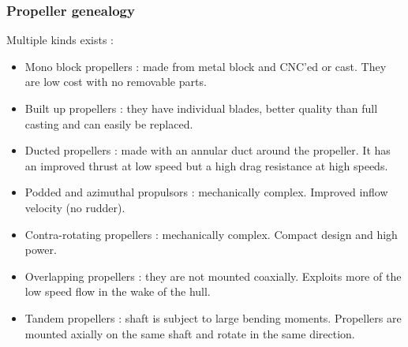 \documentclass[../main.tex]{subfiles}
\begin{document}
\subsubsection{Propeller genealogy}
Multiple kinds exists : \begin{itemize}
    \item Mono block propellers : made from metal block and CNC'ed or cast. They are low cost with no removable parts.
    \item Built up propellers : they have individual blades, better quality than full casting and can easily be replaced.
    \item Ducted propellers : made with an annular duct around the propeller. It has an improved thrust at low speed but a high drag resistance at high speeds.
    \item Podded and azimuthal propulsors : mechanically complex. Improved inflow velocity (no rudder). 
    \item Contra-rotating propellers : mechanically complex. Compact design and high power. 
    \item Overlapping propellers : they are not mounted coaxially. Exploits more of the low speed flow in the wake of the hull.
    \item Tandem propellers : shaft is subject to large bending moments. Propellers are mounted axially on the same shaft and rotate in the same direction.
\end{itemize}
\end{document}
